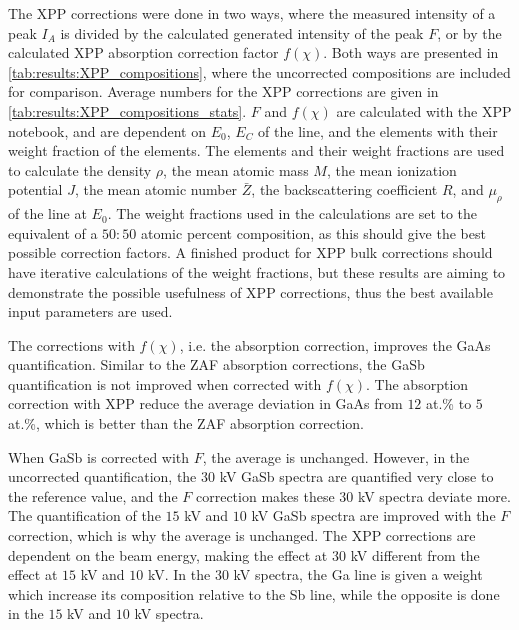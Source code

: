 The XPP corrections were done in two ways, where the measured intensity of a peak $I_A$ is divided by the calculated generated intensity of the peak $F$, or by the calculated XPP absorption correction factor $f(\chi)$.
Both ways are presented in \cref{tab:results:XPP_compositions}, where the uncorrected compositions are included for comparison.
Average numbers for the XPP corrections are given in \cref{tab:results:XPP_compositions_stats}.
$F$ and $f(\chi)$ are calculated with the XPP notebook, and are dependent on $E_0$, $E_C$ of the line, and the elements with their weight fraction of the elements.
The elements and their weight fractions are used to calculate the density $\rho$, the mean atomic mass $M$, the mean ionization potential $J$, the mean atomic number $\bar{Z}$, the backscattering coefficient $R$, and $\mu_\rho$ of the line at $E_0$.
The weight fractions used in the calculations are set to the equivalent of a $50:50$ atomic percent composition, as this should give the best possible correction factors.
A finished product for XPP bulk corrections should have iterative calculations of the weight fractions, but these results are aiming to demonstrate the possible usefulness of XPP corrections, thus the best available input parameters are used.


The corrections with $f(\chi)$, i.e. the absorption correction, improves the GaAs quantification.
Similar to the ZAF absorption corrections, the GaSb quantification is not improved when corrected with $f(\chi)$.
The absorption correction with XPP reduce the average deviation in GaAs from $12$ at.\% to $5$ at.\%, which is better than the ZAF absorption correction.

When GaSb is corrected with $F$, the average is unchanged.
However, in the uncorrected quantification, the $30$ kV GaSb spectra are quantified very close to the reference value, and the $F$ correction makes these $30$ kV spectra deviate more.
The quantification of the $15$ kV and $10$ kV GaSb spectra are improved with the $F$ correction, which is why the average is unchanged.
The XPP corrections are dependent on the beam energy, making the effect at $30$ kV different from the effect at $15$ kV and $10$ kV.
In the $30$ kV spectra, the Ga line is given a weight which increase its composition relative to the Sb line, while the opposite is done in the $15$ kV and $10$ kV spectra.


